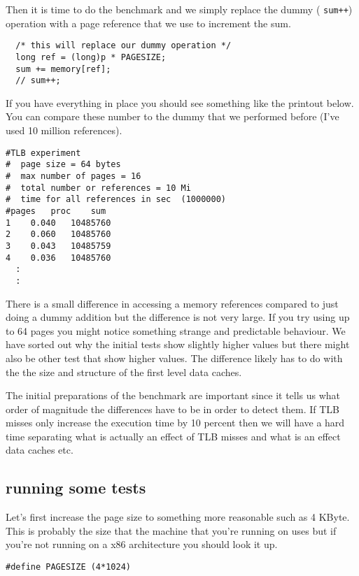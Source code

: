 \documentclass[a4paper,11pt]{article}
\begin{document}
Then it is time to do the benchmark and we simply replace the dummy ( {\tt sum++})
operation with a page reference that we use to increment the sum. 

\begin{lstlisting}
  /* this will replace our dummy operation */
  long ref = (long)p * PAGESIZE;
  sum += memory[ref];
  // sum++;
\end{lstlisting}

If you have everything in place you should see something like the
printout below. You can compare these number to the dummy that we
performed before (I've used 10 million references).


\begin{verbatim}
#TLB experiment
#  page size = 64 bytes
#  max number of pages = 16
#  total number or references = 10 Mi
#  time for all references in sec  (1000000)
#pages	 proc	 sum
1	 0.040	 10485760
2	 0.060	 10485760
3	 0.043	 10485759
4	 0.036	 10485760
  :
  :
\end{verbatim}

There is a small difference in accessing a memory references compared
to just doing a dummy addition but the difference is not very
large. If you try using up to 64 pages you might notice something
strange and predictable behaviour. We have sorted out why the initial
tests show slightly higher values but there might also be other test
that show higher values. The difference likely has to do with the the
size and structure of the first level data caches. 

The initial preparations of the benchmark are important since it tells
us what order of magnitude the differences have to be in order to
detect them. If TLB misses only increase the execution time by 10
percent then we will have a hard time separating what is actually an
effect of TLB misses and what is an effect data caches etc.

\subsection{running some tests}

Let's first increase the page size to something more reasonable such
as 4 KByte. This is probably the size that the machine that you're
running on uses but if you're not running on a x86 architecture you
should look it up.


\begin{lstlisting}
#define PAGESIZE (4*1024)
\end{lstlisting}
\end{document}
